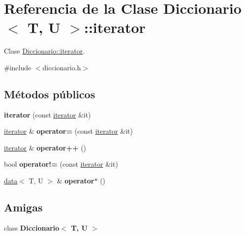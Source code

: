 \hypertarget{classDiccionario_1_1iterator}{}\section{Referencia de la Clase Diccionario$<$ T, U $>$\+:\+:iterator}
\label{classDiccionario_1_1iterator}


Clase \hyperlink{classDiccionario_1_1iterator}{Diccionario\+::iterator}.  




{\ttfamily \#include $<$diccionario.\+h$>$}

\subsection*{Métodos públicos}
\begin{DoxyCompactItemize}
\item 
\mbox{\label{classDiccionario_1_1iterator_aad7992e257dbf3011d658260417c2a3d}} 
{\bfseries iterator} (const \hyperlink{classDiccionario_1_1iterator}{iterator} \&it)
\item 
\mbox{\label{classDiccionario_1_1iterator_aaa47e370e582b831151dfb20849c9f68}} 
\hyperlink{classDiccionario_1_1iterator}{iterator} \& {\bfseries operator=} (const \hyperlink{classDiccionario_1_1iterator}{iterator} \&it)
\item 
\mbox{\label{classDiccionario_1_1iterator_aaf5fab050eb47cf1cb68f94d7335c33f}} 
\hyperlink{classDiccionario_1_1iterator}{iterator} \& {\bfseries operator++} ()
\item 
\mbox{\label{classDiccionario_1_1iterator_a9b175cb337822146e6baeb633f431f5b}} 
bool {\bfseries operator!=} (const \hyperlink{classDiccionario_1_1iterator}{iterator} \&it)
\item 
\mbox{\label{classDiccionario_1_1iterator_a5961198de25d3a3e72b41ddb2bab9a3b}} 
\hyperlink{structdata}{data}$<$ T, U $>$ \& {\bfseries operator$\ast$} ()
\end{DoxyCompactItemize}
\subsection*{Amigas}
\begin{DoxyCompactItemize}
\item 
\mbox{\label{classDiccionario_1_1iterator_ae50c4dcf749ac5c49596da52815dfa85}} 
class {\bfseries Diccionario$<$ T, U $>$}
\end{DoxyCompactItemize}


